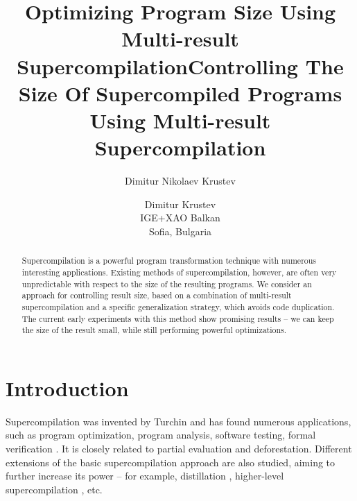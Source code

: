 \documentclass[submission,copyright,creativecommons]{eptcs}
\title{Optimizing Program Size Using Multi-result Supercompilation}
\title{Controlling The Size Of Supercompiled Programs Using Multi-result Supercompilation}
\date{\vspace{-4ex}}
\author{Dimitur Nikolaev Krustev
\institute{IGE+XAO Balkan\\ Sofia, Bulgaria}
\email{\quad \EmailAddress{dkrustev}{ige-xao.com}}
}
\author{Dimitur Krustev\\IGE+XAO Balkan\\ Sofia, Bulgaria \\ \EmailAddress{dkrustev}{ige-xao.com}}
\begin{document}
\maketitle

\begin{abstract}
Supercompilation is a powerful program transformation technique with numerous interesting applications.
Existing methods of supercompilation, however, are often very unpredictable with respect to the size
of the resulting programs.
We consider an approach for controlling result size, based on a combination of multi-result
supercompilation and a specific generalization strategy, which avoids code duplication.
The current early experiments with this method show promising results -- we can keep
the size of the result small, while still performing powerful optimizations.
\end{abstract}

\section{Introduction}

Supercompilation was invented by Turchin \cite{TurchinSupercompilerConcept} and has found numerous
applications, such as program optimization\cite{Sorensen1994TurchinSupercompiler,sorm98b,TMR/SCP2014}, 
program analysis, software testing, formal verification \cite{Klyuchnikov2010,Lisitsa2017,MendelGleasonPhD2011}.
It is closely related to partial evaluation \cite{Jones:1993:PEA:153676} and deforestation.
Different extensions of the basic supercompilation approach are also studied, aiming to further increase
its power -- for example, distillation \cite{10.1145/1244381.1244391}, higher-level supercompilation \cite{Klyuchnikov:META2010:HigherLevelScp}, etc.
\end{document}
